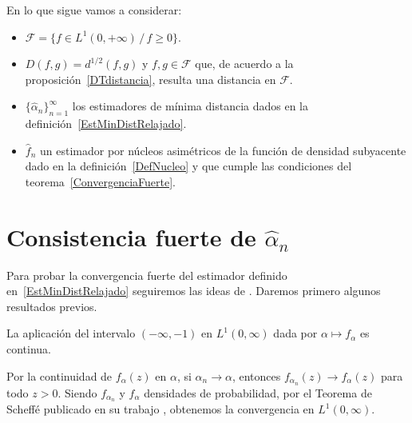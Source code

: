 \vspace{1cm}

En lo que sigue vamos a considerar:
\begin{itemize}
	\item $\mathcal{F}=\{f \in L^1(0,+\infty) \, / \, f \geq 0\}$.
	\item $D(f,g)=d^{1/2}(f,g)$ y $f,g \in \mathcal{F} $ que, de acuerdo a la proposición~\ref{DTdistancia}, resulta una distancia en $\mathcal{F}$.
	\item $\{\widehat{\alpha}_n\}_{n=1}^{\infty}$ los estimadores de mínima distancia dados en la definición~\eqref{EstMinDistRelajado}.
	\item $\widehat{f}_n$ un estimador por núcleos asimétricos de la función de densidad subyacente dado en la definición~\ref{DefNucleo} y que cumple las condiciones del teorema~\ref{ConvergenciaFuerte}.
\end{itemize}

\section{Consistencia fuerte de $\widehat{\alpha}_{n}$}

\vspace{0.5cm}

Para probar la convergencia fuerte del estimador definido en~\eqref{EstMinDistRelajado} seguiremos las ideas de \citet{parr1982}. Daremos primero algunos resultados previos.

\begin{proposition}
	\label{continuidad}
	La aplicación del intervalo $(-\infty,-1)$ en $L^{1}(0,\infty)$ dada por
	$\alpha \mapsto f_{\alpha}$ es continua.
\end{proposition}
\begin{dem}
	Por la continuidad de $f_{\alpha}(z)$ en $\alpha$, si $\alpha_{n} \to \alpha$, 
	entonces $f_{\alpha_{n}}(z) \to f_{\alpha}(z)$ para todo $z>0$.
	Siendo $f_{\alpha_{n}}$ y $f_{\alpha}$ densidades de probabilidad, por el Teorema de Scheffé publicado en su trabajo \citet{scheffe1947}, obtenemos
	la convergencia en $L^{1}(0,\infty)$.
\end{dem}

